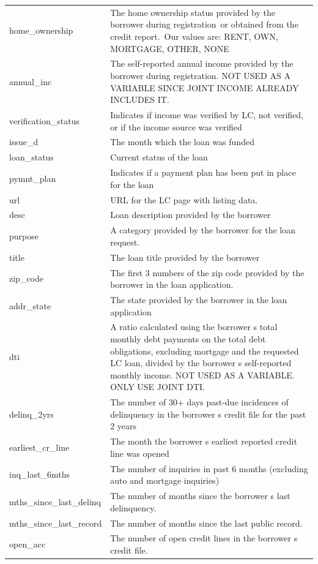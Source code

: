 \documentclass[11pt,]{report}
\begin{document}
\begin{longtable}[t]{>{\raggedright\arraybackslash}p{7cm}>{\raggedright\arraybackslash}p{7cm}}
\addlinespace
home\_ownership & The home ownership status provided by the borrower during registration or obtained from the credit report. Our values are: RENT, OWN, MORTGAGE, OTHER, NONE\\
annual\_inc & The self-reported annual income provided by the borrower during registration. NOT USED AS A VARIABLE SINCE JOINT INCOME ALREADY INCLUDES IT.\\
verification\_status & Indicates if income was verified by LC, not verified, or if the income source was verified\\
issue\_d & The month which the loan was funded\\
loan\_status & Current status of the loan\\
\addlinespace
pymnt\_plan & Indicates if a payment plan has been put in place for the loan\\
url & URL for the LC page with listing data.\\
desc & Loan description provided by the borrower\\
purpose & A category provided by the borrower for the loan request.\\
title & The loan title provided by the borrower\\
\addlinespace
zip\_code & The first 3 numbers of the zip code provided by the borrower in the loan application.\\
addr\_state & The state provided by the borrower in the loan application\\
dti & A ratio calculated using the borrower s total monthly debt payments on the total debt obligations, excluding mortgage and the requested LC loan, divided by the borrower s self-reported monthly income. NOT USED AS A VARIABLE. ONLY USE JOINT DTI.\\
delinq\_2yrs & The number of 30+ days past-due incidences of delinquency in the borrower s credit file for the past 2 years\\
earliest\_cr\_line & The month the borrower s earliest reported credit line was opened\\
\addlinespace
inq\_last\_6mths & The number of inquiries in past 6 months (excluding auto and mortgage inquiries)\\
mths\_since\_last\_delinq & The number of months since the borrower s last delinquency.\\
mths\_since\_last\_record & The number of months since the last public record.\\
open\_acc & The number of open credit lines in the borrower s credit file.\\

\end{longtable}
\end{document}
